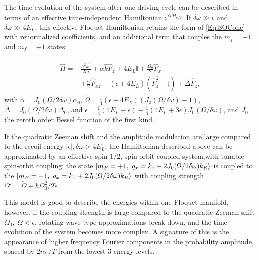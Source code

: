 
The time evolution of the system after one driving cycle can be described in terms of an effective time-independent Hamiltonian $e^{iT\hat{H}_{eff}}$. If $\delta\omega \gg \epsilon$ and $\delta\omega \gg 4E_L$, this effective Floquet Hamiltonian retains the form of \ref{Eq:SOCone} with renormalized coefficients, and an additional term that couples the $m_f=-1$ and $m_f=+1$ states:

\begin{align}
	\begin{split}
		\hat{H} = &\frac{\hbar^2\hat{k}^2}{2m} + \alpha\hat{k}\hat{F}_z +4E_L\mathbb{I} + \frac{\Omega_0}{2}\hat{F}_x \\
		&+ \frac{\tilde{\Omega}}{2}\hat{F}_{xz} +(\tilde{\epsilon}+4E_L)(\hat{F}_z^2-\mathbb{I}) +\tilde{\Delta}\hat{F}_z, 
		\label{Eq:SOCeff}
	\end{split}
\end{align}	
%
with $\alpha= J_0(\Omega/2\delta\omega)\alpha_0$, $\tilde{\Omega}=\frac{1}{4}(\epsilon+4E_L) (J_0(\Omega/\delta\omega)-1)$, $\Delta=J_0(\Omega/2\delta\omega)\Delta_0$, and $\tilde{\epsilon}= \frac{1}{4}(4E_L-\epsilon) - 
\frac{1}{4}(4E_L + 3 \epsilon) J_0( \Omega/\delta\omega)$, and $J_0$ the zeroth order Bessel function of the first kind.

If the quadratic Zeeman shift and the amplitude modulation are large compared to the recoil energy $|\epsilon|, \delta\omega >4E_L$, the Hamiltonian described above can be approximated by an effective spin $1/2$, spin-orbit coupled system,with tunable spin-orbit coupling: the state $\ket{m_F=+1,\ q_x=k_x-2J_0(\Omega/2\delta\omega)k_R}$ is coupled to the $\ket{m_F=-1,\ q_x=k_x+2J_0(\Omega/2\delta\omega)k_R}$ with coupling strength  $\Omega'=\tilde{\Omega}+\hbar\Omega_0^2/2\tilde{\epsilon}$.

This model is good to describe the energies within one Floquet manifold, however, if the coupling strength is large compared to the quadratic Zeeman shift $\Omega_0,\ \Omega<\epsilon$, rotating wave type approximations break down, and the time evolution of the system becomes more complex. A signature of this is the appearance of higher frequency Fourier components in the probability amplitude, spaced by $2n\pi/T$ from the lowest 3 energy levels. 
 

